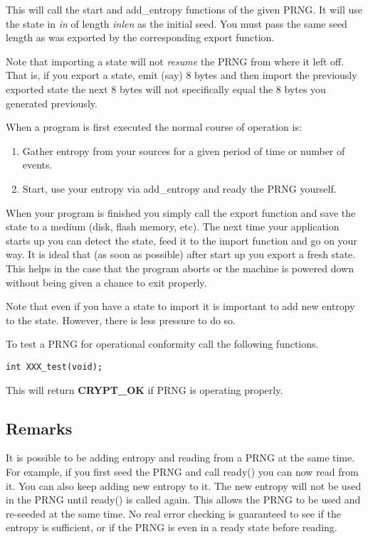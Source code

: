 \documentclass[synpaper]{book}
\begin{document}
This will call the start and add\_entropy functions of the given PRNG.  It will use the state in
\textit{in} of length \textit{inlen} as the initial seed.  You must pass the same seed length as was exported
by the corresponding export function.

Note that importing a state will not \textit{resume} the PRNG from where it left off.  That is, if you export
a state, emit (say) 8 bytes and then import the previously exported state the next 8 bytes will not 
specifically equal the 8 bytes you generated previously.

When a program is first executed the normal course of operation is:

\begin{enumerate}
   \item Gather entropy from your sources for a given period of time or number of events.
   \item Start, use your entropy via add\_entropy and ready the PRNG yourself.
\end{enumerate}

When your program is finished you simply call the export function and save the state to a medium (disk,
flash memory, etc).  The next time your application starts up you can detect the state, feed it to the 
import function and go on your way.  It is ideal that (as soon as possible) after start up you export a
fresh state.  This helps in the case that the program aborts or the machine is powered down without
being given a chance to exit properly.  

Note that even if you have a state to import it is important to add new entropy to the state.  However,
there is less pressure to do so.  

To test a PRNG for operational conformity call the following functions.

\begin{verbatim}
int XXX_test(void);
\end{verbatim}

This will return \textbf{CRYPT\_OK} if PRNG is operating properly.

\subsection{Remarks}

It is possible to be adding entropy and reading from a PRNG at the same time.  For example, if you first seed the PRNG
and call ready() you can now read from it.  You can also keep adding new entropy to it.  The new entropy will not be used
in the PRNG until ready() is called again.  This allows the PRNG to be used and re-seeded at the same time.  No real error 
checking is guaranteed to see if the entropy is sufficient, or if the PRNG is even in a ready state before reading.
\end{document}
